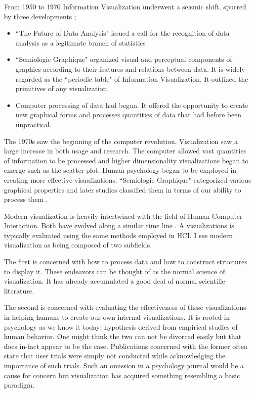 \documentclass[a4paper, 10pt, titlepage, twocolumn, onehalfspace]{article}
\begin{document}
From 1950 to 1970 Information Visualization underwent a seismic shift, spurred by three developments \cite{friendly2001milestones};
\begin{itemize}
\item ``The Future of Data Analysis" issued a call for the recognition of data analysis as a legitimate branch of statistics \cite{tukey1962future}
\item ``Semiologie Graphique" \cite{bertin1973semiologie} organized visual and perceptual components of graphics according to their features and relations between data. It is widely regarded as the ``periodic table" of Information Visualization. It outlined the primitives of any visualization.
\item Computer processing of data had begun. It offered the opportunity to create new graphical forms and processes quantities of data that had before been unpractical.
\end{itemize}

The 1970s saw the beginning of the computer revolution. Visualization saw a large increase in both usage and research. The computer allowed vast quantities of information to be processed and higher dimensionality visualizations began to emerge such as the scatter-plot. Human psychology began to be employed in creating more effective visualizations. ``Semiologie Graphique" categorized various graphical properties and later studies classified them in terms of our ability to process them \cite{cleveland1984graphical}.

Modern visualization is heavily intertwined with the field of Human-Computer Interaction. Both have evolved along a similar time line \cite{myers1998brief}. A visualizations is typically evaluated using the same methods employed in HCI. I see modern visualization as being composed of two subfields. 

The first is concerned with how to process data and how to construct structures to display it. These endeavors can be thought of as the normal science of visualization. It has already accumulated a good deal of normal scientific literature.

The second is concerned with evaluating the effectiveness of these visualizations in helping humans to create our own internal visualizations. It is rooted in psychology as we know it today: hypothesis derived from empirical studies of human behavior. One might think the two can not be divorced easily but that does in-fact appear to be the case. Publications concerned with the former often state that user trials were simply not conducted while acknowledging the importance of such trials. Such an omission in a psychology journal would be a cause for concern but visualization has acquired something resembling a basic paradigm.
\end{document}
